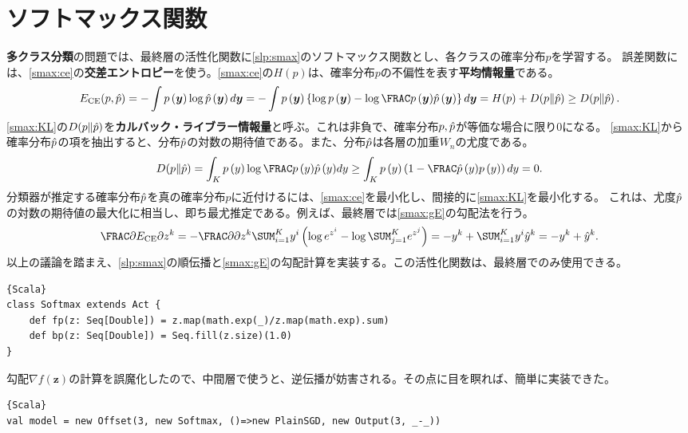 \documentclass[10pt,a4paper]{book}
\begin{document}
\section{ソフトマックス関数\label{sect:smax}}

\textbf{多クラス分類}の問題では、最終層の活性化関数に\eqref{slp:smax}のソフトマックス関数とし、各クラスの確率分布$p$を学習する。
誤差関数には、\eqref{smax:ce}の\textbf{交差エントロピー}を使う。\eqref{smax:ce}の$H(p)$は、確率分布$p$の不偏性を表す\textbf{平均情報量}である。
%
\begin{equation}
\label{eq:smax:ce}
\Ece(p,\hatp) =
-\int \prob{\bm{y}} \log \hatprob{\bm{y}} d\bm{y} =
-\int \prob{\bm{y}} \left\{\log \prob{\bm{y}} - \log\frac{\prob{\bm{y}}}{\hatprob{\bm{y}}}\right\} d\bm{y} =
H(p) + \KL{p}{\hatp} \geq
\KL{p}{\hatp}.
\end{equation}
%
\eqref{smax:KL}の$D\!\left(p\|\hat{p}\right)$を\textbf{カルバック・ライブラー情報量}と呼ぶ。これは非負で、確率分布$p,\hat{p}$が等価な場合に限り$0$になる。
\eqref{smax:KL}から確率分布$\hat{p}$の項を抽出すると、分布$\hat{p}$の対数の期待値である。また、分布$\hat{p}$は各層の加重$W_n$の尤度である。
%
\begin{equation}
\label{eq:smax:KL}
\KL{p}{\hatp} =
\int_K \prob{y} \log \frac{\prob{y}}{\hatprob{y}} dy \geq \int_K \prob{y} \tup{1-\frac{\hatprob{y}}{\prob{y}}} dy = 0.
\end{equation}
%
分類器が推定する確率分布$\hat{p}$を真の確率分布$p$に近付けるには、\eqref{smax:ce}を最小化し、間接的に\eqref{smax:KL}を最小化する。
これは、尤度$\hat{p}$の対数の期待値の最大化に相当し、即ち最尤推定である。例えば、最終層では\eqref{smax:gE}の勾配法を行う。
%
\begin{equation}
\label{eq:smax:gE}
\pdiff{\Ece}{z^k}
= - \pdiff{}{z^k} \sum_{i=1}^K y^i \tup{\log e^{z^i} - \log \sum_{j=1}^K e^{z^j}}
= - y^k + \sum_{i=1}^K y^i \hat{y}^k = -y^k + \hat{y}^k.
\end{equation}
%
以上の議論を踏まえ、\eqref{slp:smax}の順伝播と\eqref{smax:gE}の勾配計算を実装する。この活性化関数は、最終層でのみ使用できる。

\begin{Verbatim}{Scala}
class Softmax extends Act {
	def fp(z: Seq[Double]) = z.map(math.exp(_)/z.map(math.exp).sum)
	def bp(z: Seq[Double]) = Seq.fill(z.size)(1.0)
}
\end{Verbatim}

勾配$\nabla f(\bm{z})$の計算を誤魔化したので、中間層で使うと、逆伝播が妨害される。その点に目を瞑れば、簡単に実装できた。

\begin{Verbatim}{Scala}
val model = new Offset(3, new Softmax, ()=>new PlainSGD, new Output(3, _-_))
\end{Verbatim}
\end{document}
